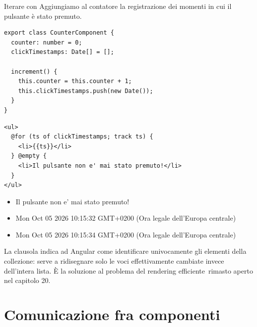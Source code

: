 \begin{esempio}{Iterare con }
Aggiungiamo al contatore la registrazione dei momenti in cui il pulsante è
stato premuto.

\begin{lstlisting}[style=ts, name=counter.component.ts]
export class CounterComponent {
  counter: number = 0;
  clickTimestamps: Date[] = [];

  increment() {
    this.counter = this.counter + 1;
    this.clickTimestamps.push(new Date());
  }
}
\end{lstlisting}

\begin{affianco}[0.4][c]
\codicepiccolo
\begin{lstlisting}[style=html, name=counter.component.html]
<ul>
  @for (ts of clickTimestamps; track ts) {
    <li>{{ts}}</li>
  } @empty {
    <li>Il pulsante non e' mai stato premuto!</li>
  }
</ul>
\end{lstlisting}
\risultato
\begin{browser}
  \begin{itemize}[leftmargin=14pt, itemsep=0pt, topsep=0pt]
    \item Il pulsante non e' mai stato premuto!
  \end{itemize}
\end{browser}
\begin{browser}
  \footnotesize
  \begin{itemize}[leftmargin=14pt, itemsep=0pt, topsep=0pt]
    \item Mon Oct 05 2026 10:15:32 GMT+0200 (Ora legale dell'Europa centrale)
    \item Mon Oct 05 2026 10:15:34 GMT+0200 (Ora legale dell'Europa centrale)
  \end{itemize}
\end{browser}
\end{affianco}

La clausola  indica ad Angular come identificare univocamente gli
elementi della collezione: serve a ridisegnare solo le voci effettivamente
cambiate invece dell'intera lista. È la soluzione al problema del
\guillemotleft rendering efficiente\guillemotright\ rimasto aperto nel capitolo 20.
\end{esempio}

\section{Comunicazione fra componenti}

